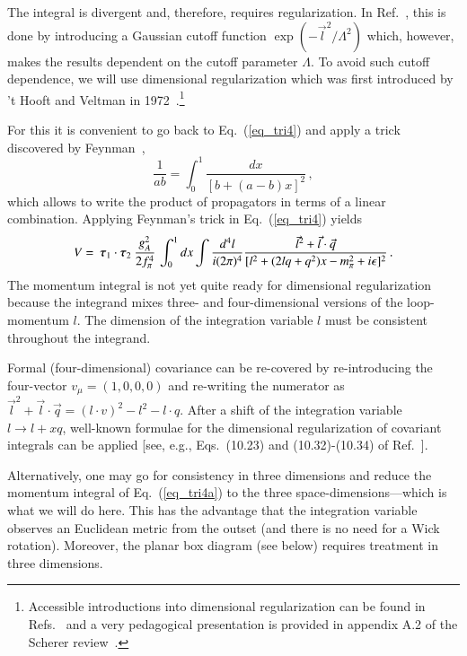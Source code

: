 \documentclass[sort&compress,preprint,3p]{elsarticle}
\newcommand{\bbox}[1]{\mbox{\boldmath $#1$}}
\begin{document}
The integral is divergent and, therefore, requires
regularization. In Ref.~\cite{ORK96}, this is done by introducing
a Gaussian cutoff function $\exp(-\vec l^2/\Lambda^2)$ which, however, 
makes the results dependent on the cutoff parameter $\Lambda$.
To avoid such cutoff dependence,
we will use dimensional 
regularization which was first introduced by 't Hooft and Veltman
in 1972~\cite{HV72}.\footnote{Accessible introductions into
dimensional regularization can be found in Refs.~\cite{Col84,MS84}
and a very pedagogical presentation is provided in appendix A.2 of the
Scherer review~\cite{Sch03}.}

For this it is convenient to go back to 
Eq.~(\ref{eq_tri4}) and
apply a trick discovered by Feynman~\cite{Fey49},
\begin{equation}
\frac{1}{ab} = \int_0^1 \frac{dx}{[b+(a-b)x]^2}
\,,
\label{eq_trick}
\end{equation}
which allows to write the product of propagators
in terms of a linear combination.
Applying Feynman's trick in 
Eq.~(\ref{eq_tri4}) yields
%
\begin{equation}
V =
\: \bbox{\tau}_1 \cdot \bbox{\tau}_2 \:
\frac{g_A^2}{2 f_\pi^4} \,
 \int_0^1 dx \int \frac{d^{4} l}{i(2 \pi)^4}
\frac{\vec l^2 + \vec l \cdot \vec q}
{[l^2+(2lq+q^2)x-m_\pi^2 + i\epsilon]^2}
\,.
\label{eq_tri4a}
\end{equation}
%
The momentum integral is not yet quite ready for dimensional
regularization because 
the integrand mixes three- and four-dimensional versions
of the loop-momentum $l$.
The dimension of the integration variable $l$ must be consistent
throughout the integrand.

Formal (four-dimensional) covariance can be re-covered 
by re-introducing the four-vector
$v_\mu=(1,0,0,0)$ and re-writing the numerator as
$\vec l^2 + \vec l \cdot \vec q = (l\cdot v)^2 -l^2 - l\cdot q$.
After a shift of the integration variable $l \rightarrow l+xq$,
well-known formulae for the dimensional regularization of
covariant integrals can be applied [see, e.g., 
Eqs.~(10.23) and (10.32)-(10.34) of Ref.~\cite{MS84}].

Alternatively, one may go for consistency in three dimensions
and reduce the momentum integral
of Eq.~(\ref{eq_tri4a}) 
to the three space-dimensions---which is what we will do here.
This has the advantage that the integration variable observes
an Euclidean metric from the outset (and there is no need for a Wick rotation).
Moreover, the planar box diagram (see below) requires treatment in three dimensions.
\end{document}
